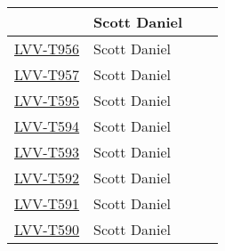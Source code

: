 \documentclass[DM,lsstdraft,STR,toc]{lsstdoc}
\begin{document}
\begin{longtable}{p{3cm}p{3cm}p{3cm}p{6cm}}
& {\small Scott Daniel } & {\small  } &
\begin{minipage}[]{6cm}
\smallskip
{\small  }
\medskip
\end{minipage}
\\ \hline
\href{https://jira.lsstcorp.org/secure/Tests.jspa#/testCase/LVV-T956}{LVV-T956}
& {\small Scott Daniel } & {\small  } &
\begin{minipage}[]{6cm}
\smallskip
{\small  }
\medskip
\end{minipage}
\\ \hline
\href{https://jira.lsstcorp.org/secure/Tests.jspa#/testCase/LVV-T957}{LVV-T957}
& {\small Scott Daniel } & {\small  } &
\begin{minipage}[]{6cm}
\smallskip
{\small  }
\medskip
\end{minipage}
\\ \hline
\href{https://jira.lsstcorp.org/secure/Tests.jspa#/testCase/LVV-T595}{LVV-T595}
& {\small Scott Daniel } & {\small  } &
\begin{minipage}[]{6cm}
\smallskip
{\small  }
\medskip
\end{minipage}
\\ \hline
\href{https://jira.lsstcorp.org/secure/Tests.jspa#/testCase/LVV-T594}{LVV-T594}
& {\small Scott Daniel } & {\small  } &
\begin{minipage}[]{6cm}
\smallskip
{\small  }
\medskip
\end{minipage}
\\ \hline
\href{https://jira.lsstcorp.org/secure/Tests.jspa#/testCase/LVV-T593}{LVV-T593}
& {\small Scott Daniel } & {\small  } &
\begin{minipage}[]{6cm}
\smallskip
{\small  }
\medskip
\end{minipage}
\\ \hline
\href{https://jira.lsstcorp.org/secure/Tests.jspa#/testCase/LVV-T592}{LVV-T592}
& {\small Scott Daniel } & {\small  } &
\begin{minipage}[]{6cm}
\smallskip
{\small  }
\medskip
\end{minipage}
\\ \hline
\href{https://jira.lsstcorp.org/secure/Tests.jspa#/testCase/LVV-T591}{LVV-T591}
& {\small Scott Daniel } & {\small  } &
\begin{minipage}[]{6cm}
\smallskip
{\small  }
\medskip
\end{minipage}
\\ \hline
\href{https://jira.lsstcorp.org/secure/Tests.jspa#/testCase/LVV-T590}{LVV-T590}
& {\small Scott Daniel } & {\small  } &

\end{longtable}
\end{document}
